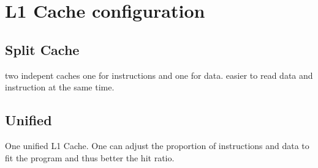 \section{L1 Cache configuration}
\subsection{Split Cache}
two indepent caches one for instructions and one for data. easier to read data and instruction at the same time.
\subsection{Unified}
One unified L1 Cache. One can adjust the proportion of instructions and data to fit the program and thus better the hit ratio.


